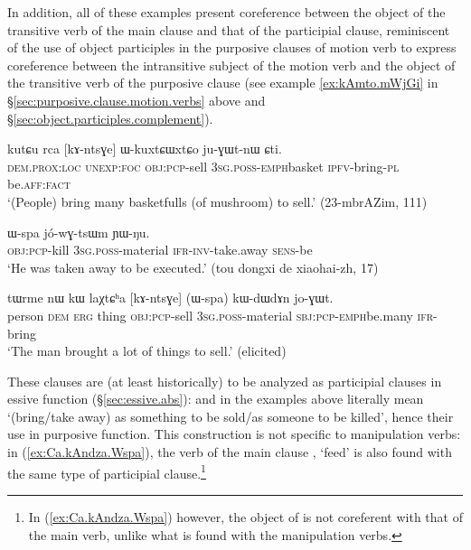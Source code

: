 In addition, all of these examples present coreference between the object of the transitive verb of the main clause and that of the participial clause, reminiscent of the use of object participles in the purposive clauses of motion verb to express coreference between the intransitive subject of the motion verb and the object of the transitive verb of the purposive clause (see example \ref{ex:kAmto.mWjGi} in §\ref{sec:purposive.clause.motion.verbs} above and §\ref{sec:object.participles.complement}).


\begin{exe}
	\ex \label{ex:kAntsGe.WkuxtCWxtCo}
	\gll  kutɕu rca [kɤ-ntsɣe] ɯ-kuxtɕɯ\redp{}xtɕo ju-ɣɯt-nɯ ɕti. \\
	\textsc{dem}.\textsc{prox}:\textsc{loc} \textsc{unexp}:\textsc{foc} \textsc{obj}:\textsc{pcp}-sell \textsc{3sg}.\textsc{poss}-\textsc{emph}\redp{}basket \textsc{ipfv}-bring-\textsc{pl} be.\textsc{aff}:\textsc{fact} \\
	\glt `(People) bring many basketfulls (of mushroom) to sell.' (23-mbrAZim, 111)
\end{exe}

\begin{exe}
	\ex \label{ex:kAsat.Wspa.jowGtsWm}
	\gll [kɤ-sat] ɯ-spa jó-wɣ-tsɯm ɲɯ-ŋu. \\
	\textsc{obj}:\textsc{pcp}-kill \textsc{3sg}.\textsc{poss}-material \textsc{ifr}-\textsc{inv}-take.away \textsc{sens}-be  \\
	\glt `He was taken away to be executed.' (tou dongxi de xiaohai-zh, 17)
\end{exe}

\begin{exe}
	\ex \label{ex:kAntsGe.Wspa.joGWt}
	\gll tɯrme nɯ kɯ laχtɕʰa [kɤ-ntsɣe] (ɯ-spa) kɯ-dɯ\redp{}dɤn jo-ɣɯt. \\
	person \textsc{dem} \textsc{erg} thing \textsc{obj}:\textsc{pcp}-sell \textsc{3sg}.\textsc{poss}-material \textsc{sbj}:\textsc{pcp}-\textsc{emph}\redp{}be.many \textsc{ifr}-bring \\
	\glt `The man brought a lot of things to sell.' (elicited)
\end{exe}

These clauses are (at least historically) to be analyzed as participial clauses in essive function (§\ref{sec:essive.abs}):  and  in the examples above literally mean `(bring/take away) as something to be sold/as someone to be killed', hence their use in purposive function. This construction is not specific to manipulation verbs: in (\ref{ex:Ca.kAndza.Wspa}), the verb of the main clause , `feed' is also found with the same type of participial clause.\footnote{In (\ref{ex:Ca.kAndza.Wspa}) however, the object of  is not coreferent with that of the main verb, unlike what is found with the manipulation verbs. }

